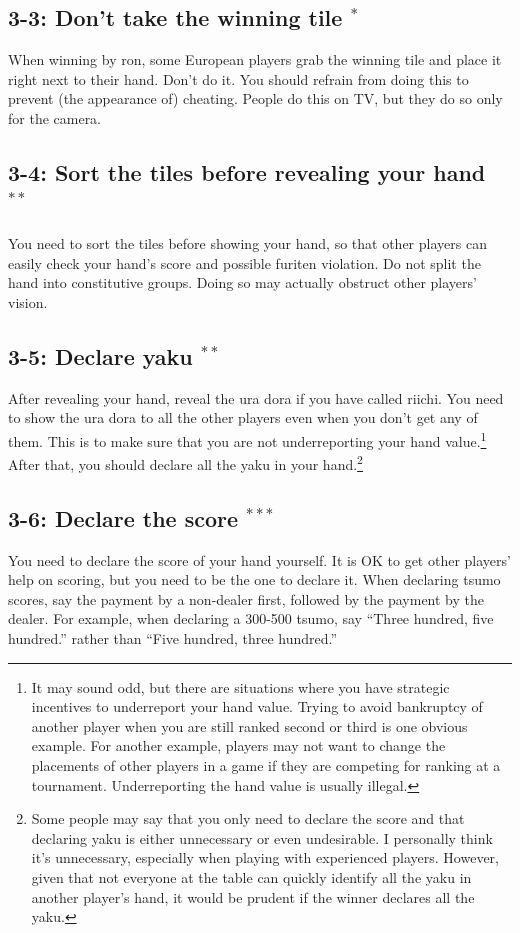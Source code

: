 \subsection*{3-3: Don't take the winning tile $^{*}$}
When winning by {\jap ron}, some European players grab the winning tile and place it right next to their hand. Don't do it. You should refrain from doing this to prevent (the appearance of) cheating. People do this on TV, but they do so only for the camera. 

\subsection*{3-4: Sort the tiles before revealing your hand $^{**}$}
You need to sort the tiles before showing your hand, so that other players can easily check your hand's score and possible {\jap furiten} violation. Do not split the hand into constitutive groups. Doing so may actually obstruct other players' vision. 

\subsection*{3-5: Declare {\jap yaku} $^{**}$}
After revealing your hand, reveal the {\jap ura dora} if you have called riichi. You need to show the {\jap ura dora} to all the other players even when you don't get any of them. This is to make sure that you are not underreporting your hand value.\footnote{It may sound odd, but there are situations where you have strategic incentives to underreport your hand value. Trying to avoid bankruptcy of another player when you are still ranked second or third is one obvious example. For another example, players may not want to change the placements of other players in a game if they are competing for ranking at a tournament. Underreporting the hand value is usually illegal.}
After that, you should declare all the {\jap yaku} in your hand.\footnote{Some people may say that you only need to declare the score and that declaring {\jap yaku} is either unnecessary or even undesirable. I personally think it's unnecessary, especially when playing with experienced players. However, given that not everyone at the table can quickly identify all the {\jap yaku} in another player's hand, it would be prudent if the winner declares all the {\jap yaku}.}

\subsection*{3-6: Declare the score $^{***}$}
You need to declare the score of your hand yourself. 
It is OK to get other players' help on scoring, but you need to be the one to declare it. When declaring {\jap tsumo} scores, say the payment by a non-dealer first, followed by the payment by the dealer. For example, when declaring a 300-500 {\jap tsumo}, say ``Three hundred, five hundred.'' rather than ``Five hundred, three hundred.'' 

